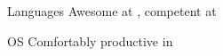 \begin{cvskills}

  \cvskill
    {Languages} %
    {Awesome at \libliststyle{\LaTeX{}}, competent at } %

  \cvskill
    {OS} %
    {Comfortably productive in } %
 
\end{cvskills}
